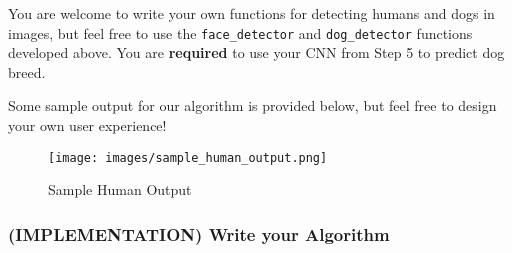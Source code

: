 \documentclass[11pt]{article}
\makeatletter
\def\maxwidth{\ifdim\Gin@nat@width>\linewidth\linewidth
    \else\Gin@nat@width\fi}
\let\Oldincludegraphics\includegraphics
\renewcommand{\includegraphics}[1]{\Oldincludegraphics[width=.8\maxwidth]{#1}}
\makeatother
\begin{document}
You are welcome to write your own functions for detecting humans and
dogs in images, but feel free to use the \texttt{face\_detector} and
\texttt{dog\_detector} functions developed above. You are
\textbf{required} to use your CNN from Step 5 to predict dog breed.

Some sample output for our algorithm is provided below, but feel free to
design your own user experience!

\begin{figure}
\centering
\texttt{[image: images/sample\_human\_output.png]}
\caption{Sample Human Output}
\end{figure}

\hypertarget{implementation-write-your-algorithm}{%
\subsubsection{(IMPLEMENTATION) Write your
Algorithm}\label{implementation-write-your-algorithm}}
\end{document}
